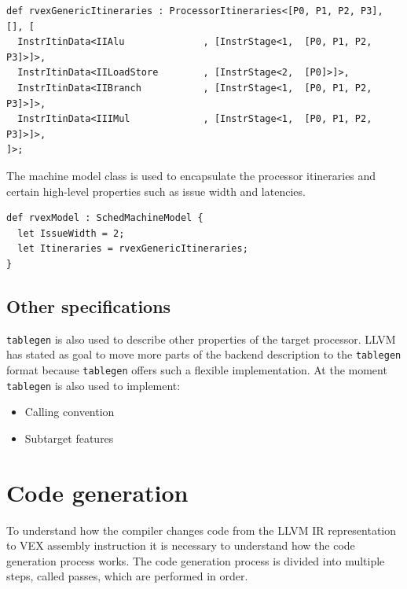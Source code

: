 \begin{lstlisting}[language=tblgen]
def rvexGenericItineraries : ProcessorItineraries<[P0, P1, P2, P3], [], [
  InstrItinData<IIAlu              , [InstrStage<1,  [P0, P1, P2, P3]>]>,
  InstrItinData<IILoadStore        , [InstrStage<2,  [P0]>]>,
  InstrItinData<IIBranch           , [InstrStage<1,  [P0, P1, P2, P3]>]>,
  InstrItinData<IIIMul             , [InstrStage<1,  [P0, P1, P2, P3]>]>,
]>;
\end{lstlisting}

The machine model class is used to encapsulate the processor itineraries and certain high-level properties such as issue width and latencies.

\begin{lstlisting}[language=tblgen]
def rvexModel : SchedMachineModel {
  let IssueWidth = 2;
  let Itineraries = rvexGenericItineraries;
}
\end{lstlisting}

\subsection{Other specifications}
\texttt{tablegen} is also used to describe other properties of the target processor. LLVM has stated as goal to move more parts of the backend description to the \texttt{tablegen} format because \texttt{tablegen} offers such a flexible implementation. At the moment \texttt{tablegen} is also used to implement:

\begin{itemize}
  \item Calling convention
  \item Subtarget features
\end{itemize}

\section{Code generation}
To understand how the compiler changes code from the LLVM IR representation to VEX assembly instruction it is necessary to understand how the code generation process works. The code generation process is divided into multiple steps, called passes, which are performed in order. 

